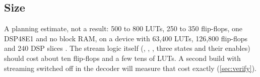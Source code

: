 \subsection{Size}

A planning estimate, not a result: 500 to 800 LUTs, 250 to 350 flip-flops, one DSP48E1 and no block RAM, on a device with 63,400 LUTs, 126,800 flip-flops and 240 DSP slices \citep{xilinx2020ds180}. The stream logic itself (, , , three states and their enables) should cost about ten flip-flops and a few tens of LUTs. A second build with streaming switched off in the decoder will measure that cost exactly (\cref{sec:verify}).
